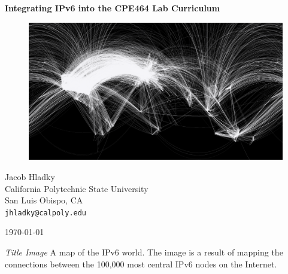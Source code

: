 \documentclass[12pt]{article}
\begin{document}
\begin{titlepage}
  \begin{center}
    \vspace*{1cm}
    \huge\textbf{{Integrating IPv6 into the CPE464 Lab Curriculum}}

    \vspace{1.5cm}

    \begin{figure}[ht!]
      \includegraphics[width=1\textwidth]{internet_map.png}
      \label{fig:internet_map}
    \end{figure}

    \vfill
    \large{
      Jacob Hladky\\
      California Polytechnic State University\\
      San Luis Obispo, CA\\
      \texttt{jhladky@calpoly.edu}
    }

    \vspace{1cm}

    \today   
  \end{center}
\end{titlepage}


\tableofcontents

\listoffigures
\bigskip
\begin{hangparas}{1.35in}{1}
\hspace{0.25in}\textit{Title Image} \hspace{0.25in} A map of the IPv6 world. The image is a result of mapping the connections between the 100,000 most central IPv6 nodes on the Internet.
\end{hangparas}

\begingroup
\let\clearpage\relax
\listoftables
\endgroup
\clearpage
\end{document}
